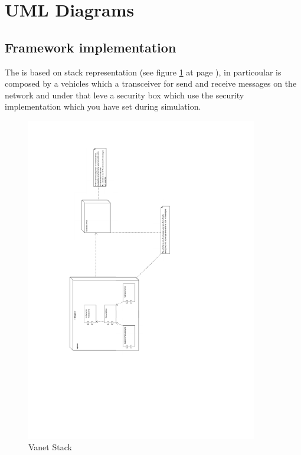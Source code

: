 \section{UML Diagrams}
\subsection{Framework implementation}
The \vs is based on stack representation (see figure \ref{fig:vanet_stack} at page \pageref{fig:vanet_stack}), in particoular is composed by a vehicles which a transceiver for send and receive messages on the network and under that leve a security box which use the security implementation which you have set during simulation.
\begin{figure}[ht]
\centerline{\includegraphics[width=0.9\textwidth]{vanet_stack.pdf}}
\caption{Vanet Stack}
\label{fig:vanet_stack}
\end{figure}

